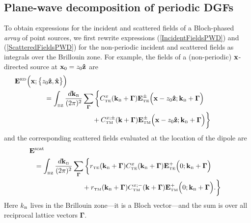 \documentclass[letterpaper]{article}
\newcommand{\vbGamma}{\boldsymbol{\Gamma}}
\begin{document}
\subsection{Plane-wave decomposition of periodic DGFs}

To obtain expressions for the incident and scattered
fields of a Bloch-phased \textit{array} of point sources,
we first rewrite expressions (\ref{IncidentFieldsPWD})
and (\ref{ScatteredFieldsPWD}) for the non-periodic
incident and scattered fields as integrals over the 
Brillouin zone. For example, the fields of a (non-periodic)
$\mathbf{x}$-directed source at $\mathbf{x}_0=z_0\mathbf{\hat z}$ are
\begin{align*}
 &\hspace{-0.6in}
\vb E\supt{ED}\Big(\vb x; \big\{ z_0 \vbhat{z}, \vbhat{x} \big\}\Big)
\\
 &= \int\subt{BZ} \frac{d \vb k\subt{B}}{(2\pi)^2} 
    \sum_{\vbGamma}
    \bigg\{ C^{x}\subt{TE}(\vb k\subt{B} + \vbGamma)
	    \vb E^\pm\subt{TE}\Big(\vb x-z_0\vbhat{z}; \vb k\subt{B}+\vbGamma\Big)
\\
&\quad\qquad\qquad\qquad +
           C^{x;\pm}\subt{TM}(\vb k+\vbGamma)
	   \vb E^\pm\subt{TM}\Big(\vb x-z_0\vbhat{z}; \vb k\subt{B}+\vbGamma\Big)
   \bigg\}
\end{align*}
and the corresponding scattered fields evaluated at the location
of the dipole are
\begin{align*}
 &\hspace{-0.1in}
\vb E\sups{scat}
\\
 &= \int\subt{BZ} \frac{d \vb k\subt{B}}{(2\pi)^2} 
    \sum_{\vbGamma}
    \bigg\{ r\subt{TE}(\vb k\subt{B} + \vbGamma)
            C^{x}\subt{TE}(\vb k\subt{B} + \vbGamma)
	    \vb E^+\subt{TE}\Big(0; \vb k\subt{B}+\vbGamma\Big)
\\
&\quad\qquad\qquad\qquad +
            r\subt{TM}(\vb k\subt{B} + \vbGamma)
           C^{x;-}\subt{TM}(\vb k+\vbGamma)
	   \vb E^+\subt{TM}\Big(0; \vb k\subt{B}+\vbGamma\Big).
   \bigg\}
\end{align*}
Here $k_{\hbox{\tiny{B}}}$ lives in the Brillouin zone---it is a Bloch vector---and
the sum is over all reciprocal lattice vectors $\vbGamma$.

\newpage
\end{document}

